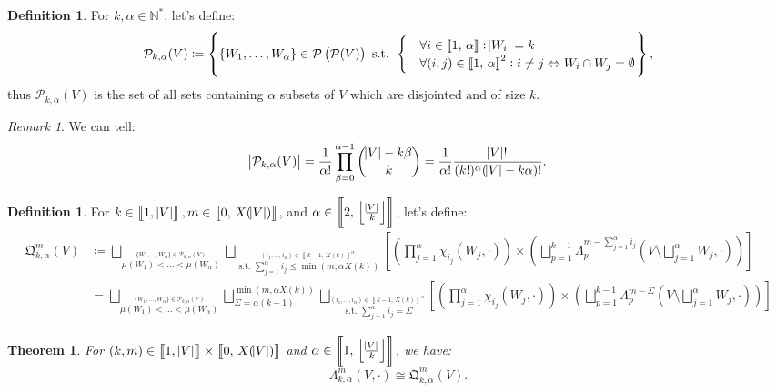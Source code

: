 \documentclass{article}
\newtheorem{theorem}[lemma]{Theorem}
\theoremstyle{definition}
\newtheorem{definition}[lemma]{Definition}
\theoremstyle{remark}
\newtheorem*{remark}{Remark}
\newcommand{\N}{\mathbb N}
\newcommand{\intint}[2]{\left\llbracket#1, \, #2\right\rrbracket}
\newcommand{\floor}[1]{\left\lfloor#1\right\rfloor}
\newcommand{\st}{\text{ s.t. }}
\begin{document}
		\begin{definition} For $k, \alpha \in \N^*$, let's define:
		\[\mathcal P_{k,\alpha}(V) \coloneqq \left\{\{W_1, \ldots, W_\alpha\} \in \mathcal P\left(\mathcal P(V)\right) \st
			\begin{cases}
					&\forall i \in \intint 1\alpha : \abs {W_i} = k \\
					&\forall (i, j) \in \intint 1\alpha^2 : i \neq j \Leftrightarrow W_i \cap W_j = \emptyset
				\end{cases}
		\right\},\]
		thus $\mathcal P_{k,\alpha}(V)$ is the set of all sets containing $\alpha$ subsets of $V$ which are disjointed and of size $k$.
		\end{definition}

		\begin{remark} We can tell:
		\[\abs {\mathcal P_{k,\alpha}(V)} = \frac 1{\alpha!}\prod_{\beta=0}^{\alpha-1}\binom {\abs V-k\beta}k = \frac 1{\alpha!}\frac {\abs V!}{(k!)^\alpha(\abs V-k\alpha)!}.\]
		\end{remark}

		\begin{definition} For $k \in \intint 1{\abs V}, m \in \intint 0{X(\abs V)}$, and $\alpha \in \intint 2{\floor {\frac {\abs V}k}}$, let's define:
		\begin{align*}
			\mathfrak Q_{k,\alpha}^m(V) &\coloneqq
					\bigsqcup_{\stackrel {\{W_1, \ldots, W_\alpha\} \in \mathcal P_{k,\alpha}(V)}{\mu(W_1) < \ldots < \mu(W_\alpha)}}
						\bigsqcup_{\stackrel {(i_1, \ldots, i_\alpha) \in \intint {k-1}{X(k)}^\alpha}{\st \sum_{j=1}^\alpha i_j \leq \min\left(m, \alpha X(k)\right)}}
						\left[\left(\prod_{j=1}^\alpha \chi_{i_j}(W_j, \cdot)\right) \times \left(\bigsqcup_{p=1}^{k-1}
							\Lambda_p^{m-\sum_{j=1}^\alpha i_j}\left(V \setminus \bigsqcup_{j=1}^\alpha W_j, \cdot\right)\right)\right] \\
				&= \bigsqcup_{\stackrel {\{W_1, \ldots, W_\alpha\} \in \mathcal P_{k,\alpha}(V)}{\mu(W_1) < \ldots < \mu(W_\alpha)}}
					\bigsqcup_{\Sigma=\alpha(k-1)}^{\min\left(m, \alpha X(k)\right)}
					\bigsqcup_{\stackrel {(i_1, \ldots, i_\alpha) \in \intint {k-1}{X(k)}^\alpha}{\st \sum_{j=1}^\alpha i_j = \Sigma}}
						\left[\left(\prod_{j=1}^\alpha \chi_{i_j}(W_j, \cdot)\right) \times \left(\bigsqcup_{p=1}^{k-1}
							\Lambda_p^{m-\Sigma}\left(V \setminus \bigsqcup_{j=1}^\alpha W_j, \cdot\right)\right)\right]
		\end{align*}
		\end{definition}

		\begin{theorem} For $(k, m) \in \intint 1{\abs V} \times \intint 0{X(\abs V)}$ and $\alpha \in \intint 1{\floor {\frac {\abs V}k}}$, we have:
		\[\Lambda_{k,\alpha}^m(V, \cdot) \cong \mathfrak Q_{k,\alpha}^m(V).\]
		\end{theorem}
\end{document}
